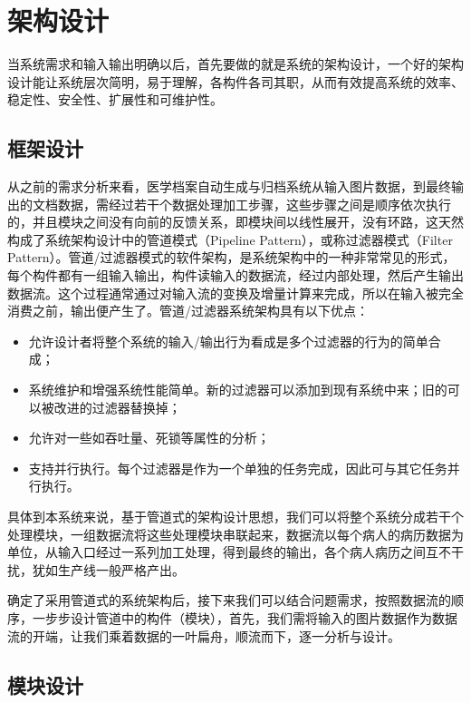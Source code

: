\chapter{架构设计}
\label{chap:system-framework}
当系统需求和输入输出明确以后，首先要做的就是系统的架构设计，一个好的架构设计能让系统层次简明，易于理解，各构件各司其职，从而有效提高系统的效率、稳定性、安全性、扩展性和可维护性。

\section{框架设计}
从之前的需求分析来看，医学档案自动生成与归档系统从输入图片数据，到最终输出的文档数据，需经过若干个数据处理加工步骤，这些步骤之间是顺序依次执行的，并且模块之间没有向前的反馈关系，即模块间以线性展开，没有环路，这天然构成了系统架构设计中的管道模式（Pipeline Pattern）\citep{Vermeulen1995pipeline}，或称过滤器模式（Filter Pattern）。管道/过滤器模式的软件架构，是系统架构中的一种非常常见的形式，每个构件都有一组输入输出，构件读输入的数据流，经过内部处理，然后产生输出数据流。这个过程通常通过对输入流的变换及增量计算来完成，所以在输入被完全消费之前，输出便产生了。管道/过滤器系统架构具有以下优点：
\begin{itemize}
	\item 允许设计者将整个系统的输入/输出行为看成是多个过滤器的行为的简单合成；
	\item 系统维护和增强系统性能简单。新的过滤器可以添加到现有系统中来；旧的可以被改进的过滤器替换掉；
	\item 允许对一些如吞吐量、死锁等属性的分析；
	\item 支持并行执行。每个过滤器是作为一个单独的任务完成，因此可与其它任务并行执行。
\end{itemize}
具体到本系统来说，基于管道式的架构设计思想，我们可以将整个系统分成若干个处理模块，一组数据流将这些处理模块串联起来，数据流以每个病人的病历数据为单位，从输入口经过一系列加工处理，得到最终的输出，各个病人病历之间互不干扰，犹如生产线一般严格产出。

确定了采用管道式的系统架构后，接下来我们可以结合问题需求，按照数据流的顺序，一步步设计管道中的构件（模块），首先，我们需将输入的图片数据作为数据流的开端，让我们乘着数据的一叶扁舟，顺流而下，逐一分析与设计。

\section{模块设计}
